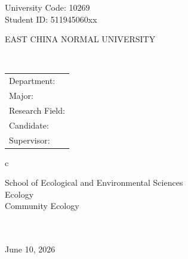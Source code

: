 \newpage

\pagestyle{empty}

\newline
\hspace*{\fill} {University Code: 10269}\\
\hspace*{\fill} {Student ID: 
511945060xx
}%

\vskip 2cm

\begin{center}
    {\yihao \rmfamily EAST CHINA NORMAL UNIVERSITY}
\end{center}

\vskip 3cm

\begin{center}
    {\fontsize{16pt}{24pt}\selectfont\bfseries \rmfamily \thesisETitle}\\
\end{center}

\vskip 2cm {\large
        \begin{center}
            \begin{tabular}{l}
                Department:         \\
                Major:              \\
                Research Field: \\
                Candidate:         \\
                Supervisor:
            \end{tabular}
            \begin{tabular}c

                School of Ecological and Environmental Sciences\\
                \hline Ecology\\
                \hline Community Ecology\\
                \hline ~\\
                \hline ~\\


                \hline
            \end{tabular}
        \end{center}}

\vskip 30mm

\begin{center}
    {\Large June 10, 2026}
\end{center}
